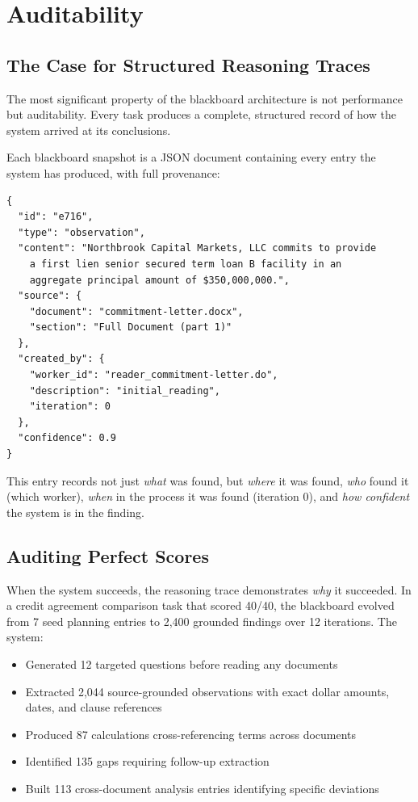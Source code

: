 \documentclass[11pt,a4paper]{article}
\begin{document}

\section{Auditability}

\subsection{The Case for Structured Reasoning Traces}

The most significant property of the blackboard architecture is not performance but auditability. Every task produces a complete, structured record of how the system arrived at its conclusions.

Each blackboard snapshot is a JSON document containing every entry the system has produced, with full provenance:

\begin{lstlisting}
{
  "id": "e716",
  "type": "observation",
  "content": "Northbrook Capital Markets, LLC commits to provide
    a first lien senior secured term loan B facility in an
    aggregate principal amount of $350,000,000.",
  "source": {
    "document": "commitment-letter.docx",
    "section": "Full Document (part 1)"
  },
  "created_by": {
    "worker_id": "reader_commitment-letter.do",
    "description": "initial_reading",
    "iteration": 0
  },
  "confidence": 0.9
}
\end{lstlisting}

This entry records not just \textit{what} was found, but \textit{where} it was found, \textit{who} found it (which worker), \textit{when} in the process it was found (iteration 0), and \textit{how confident} the system is in the finding.

\subsection{Auditing Perfect Scores}

When the system succeeds, the reasoning trace demonstrates \textit{why} it succeeded. In a credit agreement comparison task that scored 40/40, the blackboard evolved from 7 seed planning entries to 2,400 grounded findings over 12 iterations. The system:

\begin{itemize}[leftmargin=2em]
\item Generated 12 targeted questions before reading any documents
\item Extracted 2,044 source-grounded observations with exact dollar amounts, dates, and clause references
\item Produced 87 calculations cross-referencing terms across documents
\item Identified 135 gaps requiring follow-up extraction
\item Built 113 cross-document analysis entries identifying specific deviations
\end{itemize}
\end{document}
